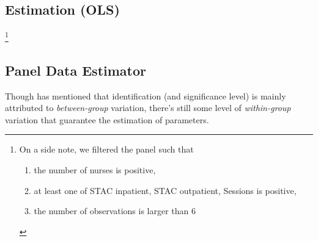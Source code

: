 \documentclass[12pt]{article}
\begin{document}
\subsection{Estimation (OLS)}

\footnote{On a side note, we filtered the panel such that
    \begin{enumerate}
        \item the number of nurses is positive,
        \item at least one of STAC inpatient, STAC outpatient, Sessions is positive,
        \item the number of observations is larger than 6
    \end{enumerate}}

\begin{table}
    
\end{table}

\begin{table}
    
\end{table}

\subsection{Panel Data Estimator}
Though \cite{croiset2024hospitals} has mentioned that identification (and
significance level) is mainly attributed to \textit{between-group} variation,
there's still some level of \textit{within-group} variation that guarantee the
estimation of parameters.

\begin{table}
    
\end{table}

\newpage

\end{document}
